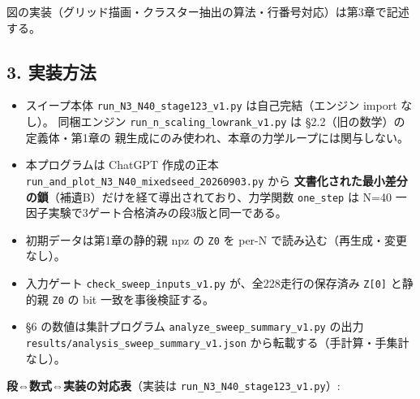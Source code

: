\documentclass[
  a4paper,
]{ltjsarticle}
\providecommand{\tightlist}{%
  \setlength{\itemsep}{0pt}\setlength{\parskip}{0pt}}
\begin{document}
図の実装（グリッド描画・クラスター抽出の算法・行番号対応）は第3章で記述する。

\subsection{3. 実装方法}\label{ux5b9fux88c5ux65b9ux6cd5}

\begin{itemize}
\tightlist
\item
  スイープ本体 \texttt{run\_N3\_N40\_stage123\_v1.py}
  は自己完結（エンジン import なし）。 同梱エンジン
  \texttt{run\_n\_scaling\_lowrank\_v1.py} は
  §2.2（旧の数学）の定義体・第1章の
  親生成にのみ使われ、本章の力学ループには関与しない。
\item
  本プログラムは ChatGPT 作成の正本
  \texttt{run\_and\_plot\_N3\_N40\_mixedseed\_20260903.py} から
  \textbf{文書化された最小差分の鎖}（補遺B）だけを経て導出されており、力学関数
  \texttt{one\_step} は N=40
  一因子実験で3ゲート合格済みの段3版と同一である。
\item
  初期データは第1章の静的親 npz の \texttt{Z0} を per-N
  で読み込む（再生成・変更なし）。
\item
  入力ゲート \texttt{check\_sweep\_inputs\_v1.py}
  が、全228走行の保存済み \texttt{Z{[}0{]}} と静的親 \texttt{Z0} の bit
  一致を事後検証する。
\item
  §6 の数値は集計プログラム \texttt{analyze\_sweep\_summary\_v1.py}
  の出力 \texttt{results/analysis\_sweep\_summary\_v1.json}
  から転載する（手計算・手集計なし）。
\end{itemize}

\textbf{段⇔数式⇔実装の対応表}（実装は
\texttt{run\_N3\_N40\_stage123\_v1.py}）:
\end{document}
